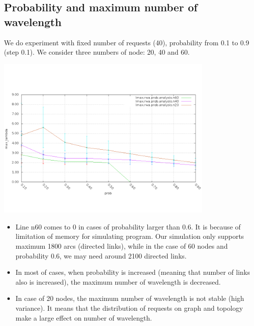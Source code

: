 \documentclass[a4paper]{article}
\begin{document}
\subsection{Probability and maximum number of wavelength}
We do experiment with fixed number of requests (40), probability from 0.1 to 0.9 (step 0.1). We consider three numbers of node: 20, 40 and 60.
    \begin{center}
    \includegraphics[width=0.8\textwidth]{rwa-prob-results/plot_rwa_pl_l.png}
    \label{fig:plot-rwa-prob-l}
    \end{center}
\begin{itemize}
	\item Line n60 comes to 0 in cases of probability larger than 0.6. It is because of limitation of memory for simulating program. Our simulation only supports maximum 1800 arcs (directed links), while in the case of 60 nodes and probability 0.6, we may need around 2100 directed links.
	\item In most of cases, when probability is increased (meaning that number of links also is increased), the maximum number of wavelength is decreased.
	\item In case of 20 nodes, the maximum number of wavelength is not stable (high variance). It means that the distribution of requests on graph and topology make a large effect on number of wavelength. 
\end{itemize}
\end{document}
